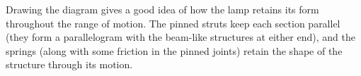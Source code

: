 \documentclass[
]{article}
\begin{document}
Drawing the diagram gives a good idea of how the lamp retains its form throughout the range of motion. The pinned struts keep each section parallel (they form a parallelogram with the beam-like structures at either end), and the springs (along with some friction in the pinned joints) retain the shape of the structure through its motion.
\end{document}
